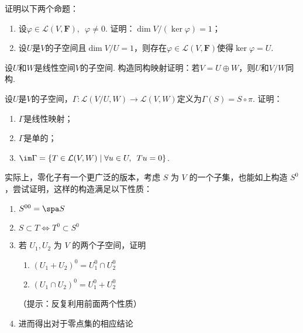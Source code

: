 \begin{exercise}

    \begin{exgroup}
        \item 证明以下两个命题：
        \begin{enumerate}
            \item 设$\varphi\in \mathcal{L}(V,\mathbf{F}),\enspace\varphi\neq 0$. 证明：$\dim V/(\ker\varphi)=1$；

            \item 设$U$是$V$的子空间且$\dim V/U=1$，则存在$\varphi\in \mathcal{L}(V,\mathbf{F})$使得$\ker\varphi=U$.
        \end{enumerate}
    \end{exgroup}

    \begin{exgroup}
        \item 设$U$和$W$是线性空间$V$的子空间. 构造同构映射证明：若$V=U\oplus W$，则$U$和$V/W$同构.

        \item 设$U$是$V$的子空间，$\Gamma:\mathcal{L}(V/U,W)\to \mathcal{L}(V,W)$定义为$\Gamma(S)=S\circ\pi$. 证明：
        \begin{enumerate}
            \item $\Gamma$是线性映射；

            \item $\Gamma$是单的；

            \item $\im\Gamma=\{T\in \mathcal{L}(V,W) \mid \forall u\in U,\enspace Tu=0\}$.
        \end{enumerate}

        \item 实际上，零化子有一个更广泛的版本，考虑 $S$ 为 $V$ 的一个子集，也能如上构造 $S^0$，尝试证明，这样的构造满足以下性质：
        \begin{enumerate}
            \item $S^{00} = \spa S$
            \item $S \subset T \iff T^0 \subset S^0$
            \item 若 $U_1, U_2$ 为 $V$ 的两个子空间，证明 \begin{enumerate}
                      \item $(U_1 + U_2)^0 = U_1^0 \cap U_2^0$
                      \item $(U_1 \cap U_2)^0 = U_1^0 + U_2^0$
                  \end{enumerate}（提示：反复利用前面两个性质）
            \item 进而得出对于零点集的相应结论
        \end{enumerate}
    \end{exgroup}

    \begin{exgroup}
        \item
    \end{exgroup}
\end{exercise}
